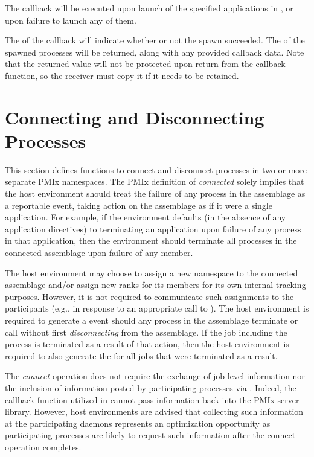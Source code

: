 The callback will be executed upon launch of the specified applications in , or upon failure to launch any of them.

The  of the callback will indicate whether or not the spawn succeeded.
The  of the spawned processes will be returned, along with any provided callback data.
Note that the returned  value will not be protected upon return from the callback function, so the receiver must copy it if it needs to be retained.


\section{Connecting and Disconnecting Processes}
\label{chap:api_proc_mgmt:connect}

This section defines functions to connect and disconnect processes in two or more separate \ac{PMIx} namespaces. The \ac{PMIx} definition of \textit{connected} solely implies that the host environment should treat the failure of any process in the assemblage as a reportable event, taking action on the assemblage as if it were a single application. For example, if the environment defaults (in the absence of any application directives) to terminating an application upon failure of any process in that application, then the environment should terminate all processes in the connected assemblage upon failure of any member.

The host environment may choose to assign a new namespace to the connected assemblage and/or assign new ranks for its members for its own internal tracking purposes. However, it is not required to communicate such assignments to the participants (e.g., in response to an appropriate call to ). The host environment is required to generate a  event should any process in the assemblage terminate or call  without first \textit{disconnecting} from the assemblage. If the job including the process is terminated as a result of that action, then the host environment is required to also generate the  for all jobs that were terminated as a result.

\advicermstart
The \textit{connect} operation does not require the exchange of job-level information nor the inclusion of information posted by  participating processes via . Indeed, the callback function utilized in  cannot pass information back into the \ac{PMIx} server library. However, host environments are advised that collecting such information at the participating daemons represents an optimization opportunity as participating processes are likely to request such information after the connect operation completes.
\advicermend

